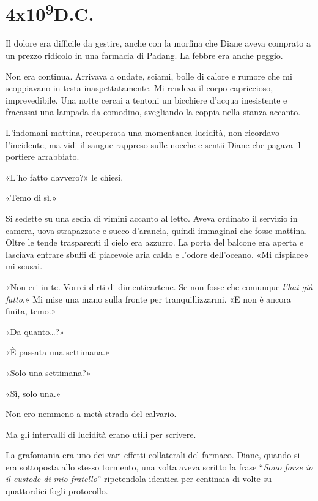 \chapter{4x10\textsuperscript{9}D.C.}\label{4x10^9}

\hfill\break

Il dolore era difficile da gestire, anche con la morfina che Diane aveva
comprato a un prezzo ridicolo in una farmacia di Padang. La febbre era
anche peggio.

Non era continua. Arrivava a ondate, sciami, bolle di calore e rumore
che mi scoppiavano in testa inaspettatamente. Mi rendeva il corpo
capriccioso, imprevedibile. Una notte cercai a tentoni un bicchiere
d'acqua inesistente e fracassai una lampada da comodino, svegliando la
coppia nella stanza accanto.

L'indomani mattina, recuperata una momentanea lucidità, non ricordavo
l'incidente, ma vidi il sangue rappreso sulle nocche e sentii Diane che
pagava il portiere arrabbiato.

«L'ho fatto davvero?» le chiesi.

«Temo di sì.»

Si sedette su una sedia di vimini accanto al letto. Aveva ordinato il
servizio in camera, uova strapazzate e succo d'arancia, quindi immaginai
che fosse mattina. Oltre le tende trasparenti il cielo era azzurro. La
porta del balcone era aperta e lasciava entrare sbuffi di piacevole aria
calda e l'odore dell'oceano. «Mi dispiace» mi scusai.

«Non eri in te. Vorrei dirti di dimenticartene. Se non fosse che
comunque \emph{l'hai già fatto}.» Mi mise una mano sulla fronte per
tranquillizzarmi. «E non è ancora finita, temo.»

«Da quanto\ldots?»

«È passata una settimana.»

«Solo una settimana?»

«Sì, solo una.»

Non ero nemmeno a metà strada del calvario.

\separatorefiori

Ma gli intervalli di lucidità erano utili per scrivere.

La grafomania era uno dei vari effetti collaterali del farmaco. Diane,
quando si era sottoposta allo stesso tormento, una volta aveva scritto
la frase ``\emph{Sono forse io il custode di mio fratello}'' ripetendola
identica per centinaia di volte su quattordici fogli protocollo.

